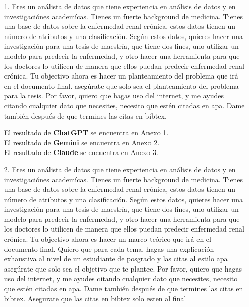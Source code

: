 \documentclass{article}
\begin{document}
\begin{itemize}
    \item[1.]
Eres un análista de datos que tiene experiencia en análisis
de datos y en investigaciónes academícas. Tienes un fuerte
background de medicina. Tienes una base de datos sobre la
enfermedad renal crónica, estos datos tienen un número de
atributos y una clasificación. Según estos datos, quieres
hacer una investigación para una tesis de maestría, que
tiene dos fines, uno utilizar un modelo para predecir la
enfermedad, y otro hacer una herramienta para que los
doctores lo utilicen de manera que ellos puedan predecir
enfermedad renal crónica. Tu objectivo ahora es hacer un
planteamiento del problema que irá en el documento final.
asegúrate que solo sea el planteamiento del problema para la
tesis. Por favor, quiero que hagas uso del internet, y me
ayudes citando cualquier dato que necesites, necesito que
estén citadas en apa. Dame también después de que termines
las citas en bibtex.

El resultado de \textbf{ChatGPT} se encuentra en Anexo 1.\\
El resultado de \textbf{Gemini} se encuentra en Anexo 2.\\
El resultado de \textbf{Claude} se encuentra en Anexo 3.
    \item[2.]
Eres un análista de datos que tiene experiencia en análisis
de datos y en investigaciónes academícas. Tienes un fuerte
background de medicina. Tienes una base de datos sobre la
enfermedad renal crónica, estos datos tienen un número de
atributos y una clasificación. Según estos datos, quieres
hacer una investigación para una tesis de maestría, que
tiene dos fines, uno utilizar un modelo para predecir la
enfermedad, y otro hacer una herramienta para que los
doctores lo utilicen de manera que ellos puedan predecir
enfermedad renal crónica. Tu objectivo ahora es hacer un
marco teórico que irá en el documento final. Quiero que para
cada tema, hagas una explicación exhaustiva al nivel de un estudiante de posgrado y las citas al estilo apa
asegúrate que solo sea el objetivo que te plantee. Por
favor, quiero que hagas uso del internet, y me
ayudes citando cualquier dato que necesites, necesito que
estén citadas en apa. Dame también después de que termines
las citas en bibtex. Asegurate que las citas en bibtex solo esten al final


\end{itemize}
\end{document}
